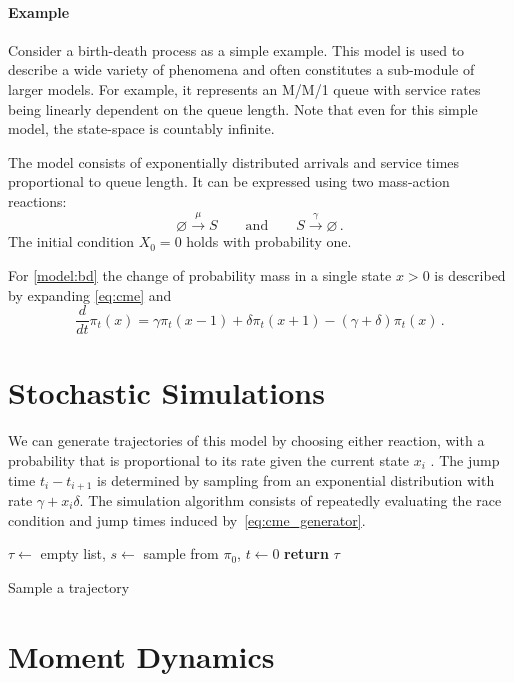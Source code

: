 \paragraph{Example} Consider a birth-death process as a simple example. This model is used to describe a wide variety of phenomena and often constitutes a sub-module of larger models.
For example, it represents an M/M/1 queue with service rates being linearly dependent on the queue length.
Note that even for this simple model, the state-space is countably infinite.
\begin{model}\label{model:bd}
The model consists of exponentially distributed arrivals and service times proportional to queue length. It can be expressed using two mass-action reactions:
$$ \varnothing \xrightarrow{\mu} S \qquad\text{and}\qquad S \xrightarrow{\gamma} \varnothing\,.$$
The initial condition $X_0=0$ holds with probability one.
\end{model}

For \autoref{model:bd} the change of probability mass in a single state $x>0$ is described by expanding
\eqref{eq:cme} and
$$\frac{d}{dt}\pi_t(x)=\gamma \pi_t(x-1) + \delta \pi_t(x+1) - (\gamma + \delta)\pi_t(x)\,.$$

\section{Stochastic Simulations}
We can generate trajectories of this model by choosing either reaction, with a probability that is
proportional to its rate given the current state $x_i$ \cite{gillespie1977exact}.
The jump time $t_i- t_{i+1}$ is determined by sampling from an exponential distribution with rate $\gamma+x_i\delta$.
The simulation algorithm consists of repeatedly evaluating the race condition and jump times induced by~\eqref{eq:cme_generator}.
\begin{algorithm}
    $\tau \leftarrow$ empty list, $s\leftarrow$ sample from $\pi_0$, $t\leftarrow 0$\;
    \textbf{return} $\tau$\;
    \caption{\label{alg:ssa}Sample a trajectory}
\end{algorithm}


\section{Moment Dynamics}
